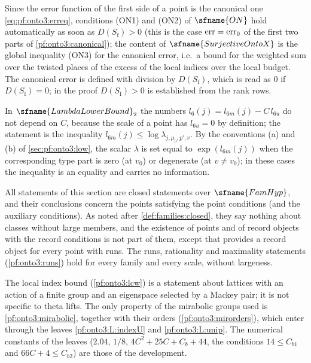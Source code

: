 \begin{remark}\label{pf:onto3:rem:canon}
Since the error function of the first side of a point is the canonical one \eqref{eq:pf:onto3:erreq}, conditions
(ON1) and (ON2) of $\sfname{ON}$ hold automatically as soon as $D(S_{\mathrm f})>0$ (this is the case $\mathrm{err}=
\mathrm{err}_0$ of the first two parts of \cref{pf:onto3:canonical}); the content of $\sfname{SurjectiveOntoX}$ is
the global inequality (ON3) for the canonical error, i.e.\ a bound for the weighted sum over the twisted places of
the excess of the local indices over the local budget. The canonical error is defined with division by
$D(S_{\mathrm f})$, which is read as $0$ if $D(S_{\mathrm f})=0$; in the proof $D(S_{\mathrm f})>0$ is established
from the rank rows.
\end{remark}

\begin{remark}\label{pf:onto3:rem:l6}
In $\sfname{LambdaLowerBound}_2$ the numbers $l_6(j)=l_{6m}(j)-C\,l_{6u}$ do not depend on $C$, because the scale of
a point has $l_{6u}=0$ by definition; the statement is the inequality $l_{6m}(j)\le\log\lambda_{j,\mu_0,p',v}$. By the
conventions (a) and (b) of \cref{sec:pf:onto3:low}, the scalar $\lambda$ is set equal to $\exp(l_{6m}(j))$ when the
corresponding type part is zero (at $v_0$) or degenerate (at $v\ne v_0$); in these cases the inequality is an
equality and carries no information.
\end{remark}

\begin{remark}\label{pf:onto3:rem:scope}
All statements of this section are closed statements over $\sfname{FamHyp}$, and their conclusions concern the
points satisfying the point conditions (and the auxiliary conditions). As noted after \cref{def:families:closed},
they say nothing about classes without large members, and the existence of points and of record objects with the
record conditions is not part of them, except that  provides a record
object for every point with runs. The runs, rationality and maximality statements (\cref{pf:onto3:runs}) hold for
every family and every scale, without largeness.
\end{remark}

\begin{remark}\label{pf:onto3:rem:mackey}
The local index bound (\cref{pf:onto3:lcw}) is a statement about lattices with an action of a finite group and an
eigenspace selected by a Mackey pair; it is not specific to theta lifts. The only property of the mirabolic groups
used is \cref{pf:onto3:mirabolic}, together with their orders (\cref{pf:onto3:mirorders}), which enter through the
leaves \ref{pf:onto3:L:indexU} and \ref{pf:onto3:L:unip}. The numerical constants of the leaves ($2.04$, $1/8$,
$4C^2+25C+C_b+44$, the conditions $14\le C_{b1}$ and $66C+4\le C_{b2}$) are those of the development.
\end{remark}

